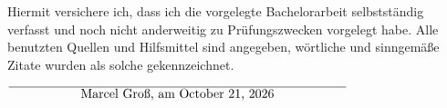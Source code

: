 \documentclass[12pt,oneside,a4paper,parskip]{scrbook}
\def\BaAuthor{Marcel Groß}
\begin{document}









\backmatter

\listoffigures
{}			



\printbibliography
{}


Hiermit versichere ich, dass ich die vorgelegte Bachelorarbeit selbstständig verfasst und noch nicht anderweitig zu Prüfungszwecken vorgelegt habe. Alle benutzten Quellen und Hilfsmittel sind angegeben, wörtliche und sinngemäße Zitate wurden als solche gekennzeichnet.

\vspace{20pt}
\begin{flushright}
$\overline{~~~~~~~~~~~~~~~~~\mbox{\BaAuthor, am \today}~~~~~~~~~~~~~~~~~}$
\end{flushright}

\appendix


\end{document}

